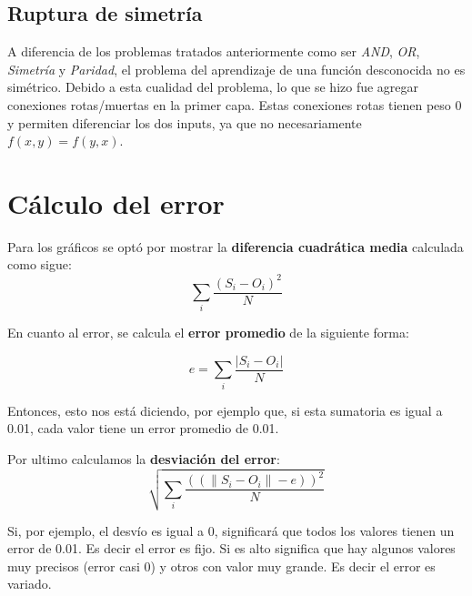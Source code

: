 \documentclass[%
    final,
    reprint,
    notitlepage,
    narroweqnarray,
    inline,
    twoside,
    invited
    ]{ieee}
\begin{document}
\subsection{Ruptura de simetría}

\par A diferencia de los problemas tratados anteriormente como ser \textit{AND}, \textit{OR}, \textit{Simetría} y \textit{Paridad}, el problema del aprendizaje de una función desconocida no es simétrico. Debido a esta cualidad del problema, lo que se hizo fue agregar conexiones rotas/muertas en la primer capa. Estas conexiones rotas tienen peso 
$0$ y permiten diferenciar los dos inputs, ya que no necesariamente $f(x, y) = f(y,x)$.

\section{Cálculo del error}

\par Para los gráficos se optó por mostrar la \textbf{diferencia cuadrática media} calculada como sigue:\\

\begin{equation}
\sum\limits_{i}\frac{(S_i - O_i)^{2}}{N}
\end{equation}

\par En cuanto al error, se calcula el \textbf{error promedio} de la siguiente forma:

\begin{equation}
e = \sum\limits_{i}\frac{|S_i - O_i|}{N}
\end{equation}


Entonces, esto nos está diciendo, por ejemplo que, si esta sumatoria es igual a 0.01, cada valor tiene un error promedio de 0.01.

\par Por ultimo calculamos la \textbf{desviación del error}:\\

\begin{equation}
\sqrt{\sum\limits_{i}\frac{((\|S_i - O_i\| - e))^2}{N}}
\end{equation}

Si, por ejemplo, el desvío es igual a 0, significará que todos los valores tienen un error de
0.01. Es decir el error es fijo. Si es alto significa que hay algunos valores muy precisos (error casi 0) y otros con valor muy grande. Es decir el error es variado.
\end{document}
